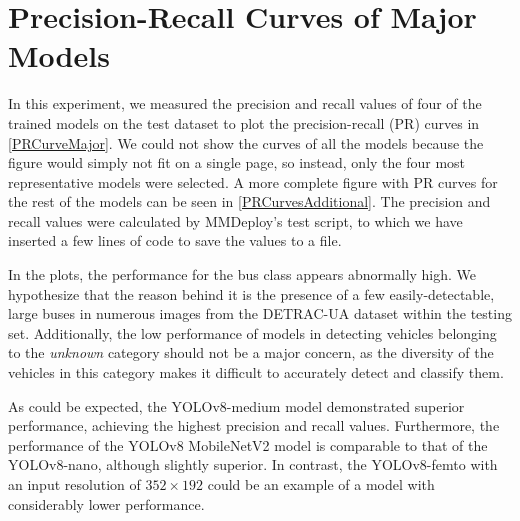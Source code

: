 \section{Precision-Recall Curves of Major Models}


In this experiment, we measured the precision and recall values of four of the
trained models on the test dataset to plot the precision-recall (PR) curves in
\autoref{PRCurveMajor}. We could not show the curves of all the models because
the figure would simply not fit on a single page, so instead, only the four most
representative models were selected. A more complete figure with PR curves for
the rest of the models can be seen in \autoref{PRCurvesAdditional}. The
precision and recall values were calculated by MMDeploy's test script, to which
we have inserted a few lines of code to save the values to a file.

In the plots, the performance for the bus class appears abnormally high. We
hypothesize that the reason behind it is the presence of a few
easily-detectable, large buses in numerous images from the DETRAC-UA dataset
within the testing set. Additionally, the low performance of models in detecting
vehicles belonging to the \textit{unknown} category should not be a major
concern, as the diversity of the vehicles in this category makes it difficult to
accurately detect and classify them.

As could be expected, the YOLOv8-medium model demonstrated superior performance,
achieving the highest precision and recall values. Furthermore, the performance
of the YOLOv8 MobileNetV2 model is comparable to that of the YOLOv8-nano,
although slightly superior. In contrast, the YOLOv8-femto with an input
resolution of $352 \times 192$ could be an example of a model with considerably
lower performance.

